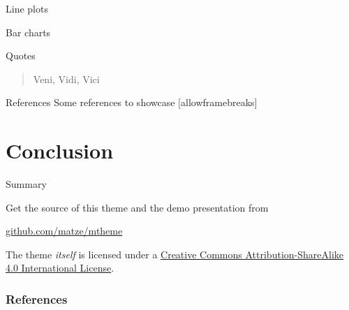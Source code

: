 \documentclass[10pt]{beamer}
\begin{document}
\begin{frame}{Line plots}
  \begin{figure}
  \end{figure}
\end{frame}
\begin{frame}{Bar charts}
  \begin{figure}
  \end{figure}
\end{frame}
\begin{frame}{Quotes}
  \begin{quote}
    Veni, Vidi, Vici
  \end{quote}
\end{frame}

\begin{frame}{References}
  Some references to showcase [allowframebreaks] \cite{knuth92,ConcreteMath,Simpson,Er01,greenwade93}
\end{frame}

\section{Conclusion}

\begin{frame}{Summary}

  Get the source of this theme and the demo presentation from

  \begin{center}\url{github.com/matze/mtheme}\end{center}

  The theme \emph{itself} is licensed under a
  \href{http://creativecommons.org/licenses/by-sa/4.0/}{Creative Commons
  Attribution-ShareAlike 4.0 International License}.

  \begin{center}\ccbysa\end{center}

\end{frame}


\begin{frame}[allowframebreaks]

  \frametitle{References}

  
  

\end{frame}
\end{document}
